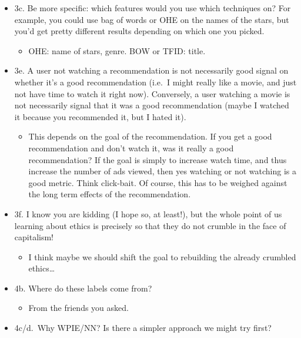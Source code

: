 \documentclass[letterpaper]{article}
\begin{document}
\begin{itemize}
\item 3c. Be more specific: which features would you use which techniques
on? For example, you could use bag of words or OHE on the names of the
stars, but you'd get pretty different results depending on which one
you picked.

\begin{itemize}
\item OHE: name of stars, genre. BOW or TFID: title.
\end{itemize}

\item 3e. A user not watching a recommendation is not necessarily good
signal on whether it's a good recommendation (i.e. I might really like
a movie, and just not have time to watch it right now). Conversely, a
user watching a movie is not necessarily signal that it was a good
recommendation (maybe I watched it because you recommended it, but I
hated it).

\begin{itemize}
\item This depends on the goal of the recommendation. If you get a good
recommendation and don't watch it, was it really a good
recommendation? If the goal is simply to increase watch time, and
thus increase the number of ads viewed, then yes watching or not
watching is a good metric. Think click-bait. Of course, this has to
be weighed against the long term effects of the recommendation.
\end{itemize}

\item 3f. I know you are kidding (I hope so, at least!), but the whole point
of us learning about ethics is precisely so that they do not crumble
in the face of capitalism!

\begin{itemize}
\item I think maybe we should shift the goal to rebuilding the already
crumbled ethics\ldots{}
\end{itemize}

\item 4b. Where do these labels come from?

\begin{itemize}
\item From the friends you asked.
\end{itemize}

\item 4c/d. Why WPIE/NN? Is there a simpler approach we might try first?


\end{itemize}
\end{document}
